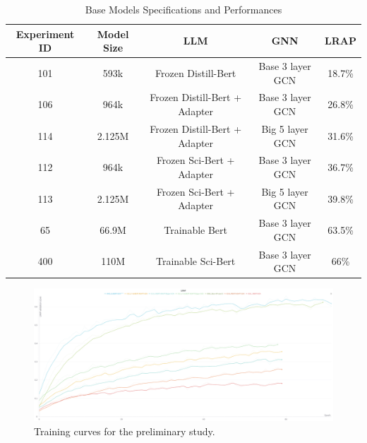 \begin{table}[h]
    \centering
    \begin{tabular}{|c|c|c|c|c|}
    \hline
    \textbf{Experiment ID} & \textbf{Model Size} & \textbf{LLM} & \textbf{GNN} & \textbf{LRAP} \\ \hline
    101         & 593k                & Frozen Distill-Bert           & Base 3 layer GCN       & 18.7\%      \\ \hline
    106         & 964k                & Frozen Distill-Bert + Adapter & Base 3 layer GCN       & 26.8\%      \\ \hline
    114         & 2.125M              & Frozen Distill-Bert + Adapter & Big 5 layer GCN        & 31.6\%      \\ \hline
    112         & 964k                & Frozen Sci-Bert + Adapter     & Base 3 layer GCN       & 36.7\%      \\ \hline
    113         & 2.125M              & Frozen Sci-Bert + Adapter     & Big 5 layer GCN        & 39.8\%      \\ \hline
    65          & 66.9M               & Trainable Bert                & Base 3 layer GCN       & 63.5\%      \\ \hline
    400         & 110M                & Trainable Sci-Bert            & Base 3 layer GCN       & 66\%        \\ \hline
    \end{tabular}
    \caption{Base Models Specifications and Performances}
    \label{tab:preliminary_study_metrics}
\end{table}

\begin{figure}
    \centering
    \includegraphics[width=1.\textwidth]{figures/preliminary_study.png}
    \caption{Training curves for the preliminary study.}
    \label{fig:preliminary_study_curves}
\end{figure}
